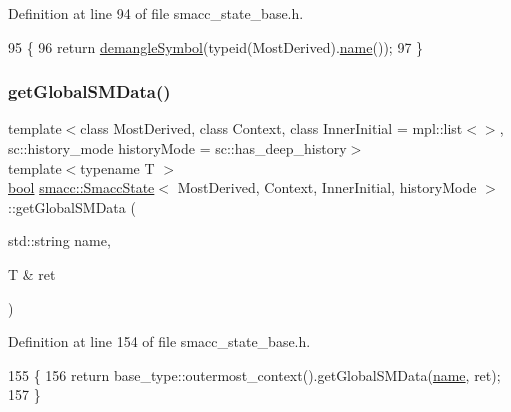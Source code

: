 Definition at line 94 of file smacc\+\_\+state\+\_\+base.\+h.


\begin{DoxyCode}
95   \{
96     \textcolor{keywordflow}{return} \hyperlink{namespacesmacc_1_1introspection_a2f495108db3e57604d8d3ff5ef030302}{demangleSymbol}(\textcolor{keyword}{typeid}(MostDerived).\hyperlink{namespaceinteractive__marker_a447655961b3d3ca3c5a2a9d3d769436d}{name}());
97   \}
\end{DoxyCode}
\mbox{\label{classsmacc_1_1SmaccState_ad53b5be2760eb7ffb50f3b2e542b65f1}} 
\subsubsection{\texorpdfstring{get\+Global\+S\+M\+Data()}{getGlobalSMData()}}
{\footnotesize\ttfamily template$<$class Most\+Derived, class Context, class Inner\+Initial = mpl\+::list$<$$>$, sc\+::history\+\_\+mode history\+Mode = sc\+::has\+\_\+deep\+\_\+history$>$ \\
template$<$typename T $>$ \\
\hyperlink{classbool}{bool} \hyperlink{classsmacc_1_1SmaccState}{smacc\+::\+Smacc\+State}$<$ Most\+Derived, Context, Inner\+Initial, history\+Mode $>$\+::get\+Global\+S\+M\+Data (\begin{DoxyParamCaption}\item[{std\+::string}]{name,  }\item[{T \&}]{ret }\end{DoxyParamCaption})\hspace{0.3cm}{\ttfamily [inline]}}



Definition at line 154 of file smacc\+\_\+state\+\_\+base.\+h.


\begin{DoxyCode}
155   \{
156     \textcolor{keywordflow}{return} base\_type::outermost\_context().getGlobalSMData(\hyperlink{namespaceinteractive__marker_a447655961b3d3ca3c5a2a9d3d769436d}{name}, ret);
157   \}
\end{DoxyCode}
\mbox{\label{classsmacc_1_1SmaccState_a69fc0aa1dbe0c00501f2890616225004}} 
